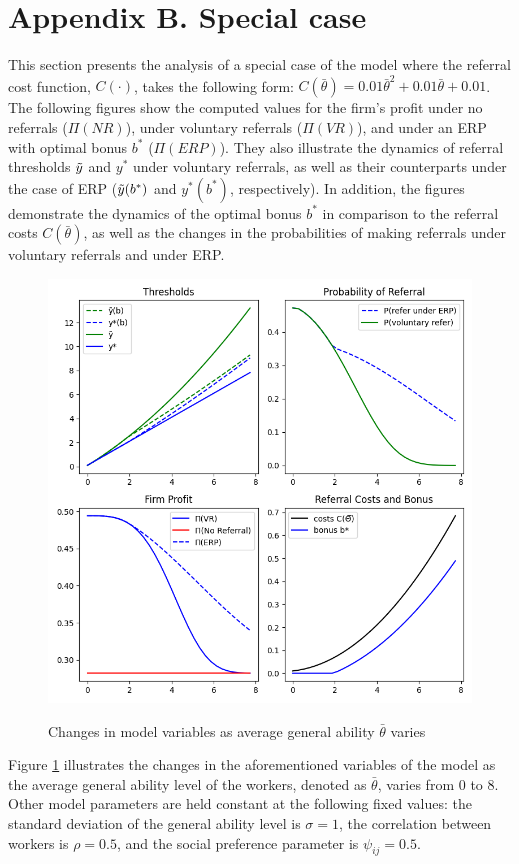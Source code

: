 \documentclass[12pt]{article}
\begin{document}
\section*{Appendix B. Special case} \label{sec:appendixb}
This section presents the analysis of a special case of the model where the referral cost function, $C(\cdot)$, takes the following form: $C(\bar{\theta}) = 0.01 \bar{\theta}^2 + 0.01 \bar{\theta} + 0.01$. The following figures show the computed values for the firm's profit under no referrals ($\Pi (NR)$), under voluntary referrals ($\Pi(VR)$), and under an ERP with optimal bonus $b^*$ ($\Pi(ERP)$). They also illustrate the dynamics of referral thresholds $\Tilde{y}$ and $y^*$ under voluntary referrals, as well as their counterparts under the case of ERP ($\Tilde{y}(b^*)$ and $y^*(b^*)$, respectively). In addition, the figures demonstrate the dynamics of the optimal bonus $b^*$ in comparison to the referral costs $C(\bar{\theta})$, as well as the changes in the probabilities of making referrals under voluntary referrals and under ERP.

\begin{figure}[ht]
    \caption{Changes in model variables as average general ability $\bar{\theta}$ varies}
    \includegraphics[width=12cm]{images/imperf_means_var.png}
    \centering
    \label{fig:mean_var}
\end{figure}

Figure \ref{fig:mean_var} illustrates the changes in the aforementioned variables of the model as the average general ability level of the workers, denoted as $\bar{\theta}$, varies from 0 to 8. Other model parameters are held constant at the following fixed values: the standard deviation of the general ability level is $\sigma = 1$, the correlation between workers is $\rho = 0.5$, and the social preference parameter is $\psi_{ij} = 0.5$.
\end{document}
